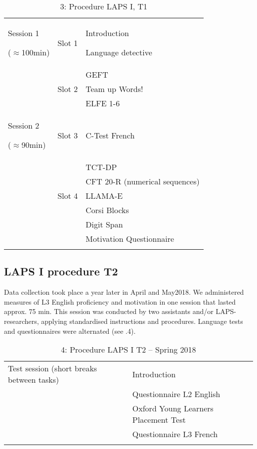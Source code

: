 \documentclass[output=paper]{langsci/langscibook}
\begin{document}
\begin{table}
\begin{tabularx}{\textwidth}{XXX}

\lsptoprule

Session 1

(${\approx}$100min) & Slot 1 & Introduction

Language detective\\
&  & GEFT\\
& Slot 2 & Team up Words!\\
&  & ELFE 1-6\\
Session 2

(${\approx}$90min) & Slot 3 & C-Test French\\
&  & TCT-DP\\
&  & CFT 20-R (numerical sequences)\\
& Slot 4 & LLAMA-E\\
&  & Corsi Blocks\\
&  & Digit Span\\
&  & Motivation Questionnaire\\
\lspbottomrule
\end{tabularx}
\caption{3: Procedure LAPS I, T1}
\label{tab:02:2}
\end{table}

 \subsection{LAPS I procedure T2}


Data collection took place a year later in April and May2018. We administered measures of L3 English proficiency and motivation in one session that lasted approx. 75 min. This session was conducted by two assistants and/or LAPS-researchers, applying standardised instructions and procedures. Language tests and questionnaires were alternated (see .4). 


\begin{table}
\begin{tabularx}{\textwidth}{XX}

\lsptoprule

Test session (short breaks between tasks) & Introduction\\
& Questionnaire L2 English\\
& Oxford Young Learners Placement Test\\
& Questionnaire L3 French\\
\lspbottomrule
\end{tabularx}
\caption{4: Procedure LAPS I T2 – Spring 2018}
\label{tab:02:2}
\end{table}
\end{document}
